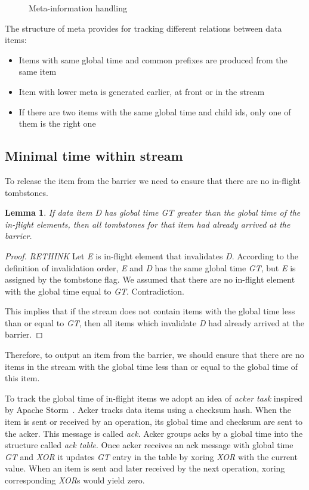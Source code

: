 \begin{figure}[htbp]
  \caption{Meta-information handling}
  \label {logical-graph-ops-figure}
\end{figure}

The structure of meta provides for tracking different relations between data items:

\begin{itemize}
  \item Items with same global time and common prefixes are produced from the same item
  \item Item with lower meta is generated earlier, at front or in the stream
  \item If there are two items with the same global time and child ids, only one of them is the right one
\end{itemize}

\label{mininal-time}
\subsection{Minimal time within stream}

To release the item from the barrier we need to ensure that there are no in-flight tombstones. 

\newtheorem{minimal-time-claim}{Lemma}

\begin{minimal-time-claim}
  If data item {\it D} has global time {\it GT} greater than the global time of the in-flight elements, then all tombstones for that item had already arrived at the barrier.
\end{minimal-time-claim}

\begin{proof}
  {\it RETHINK}
  Let {\it E} is in-flight element that invalidates {\it D}. According to the definition of invalidation order, {\it E} and {\it D} has the same global time {\it GT}, but {\it E} is assigned by the tombstone flag. We assumed that there are no in-flight element with the global time equal to {\it GT}. Contradiction.

  This implies that if the stream does not contain items with the global time less than or equal to {\it GT}, then all items which invalidate {\it D} had already arrived at the barrier. 
\end{proof}

Therefore, to output an item from the barrier, we should ensure that there are no items in the stream with the global time less than or equal to the global time of this item.

To track the global time of in-flight items we adopt an idea of {\it acker task} inspired by Apache Storm~\cite{apache:storm}. Acker tracks data items using a checksum hash. When the item is sent or received by an operation, its global time and checksum are sent to the acker. This message is called {\it ack}. Acker groups acks by a global time into the structure called {\it ack table}. Once acker receives an ack message with global time {\it GT} and {\it XOR} it updates {\it GT} entry in the table by xoring {\it XOR} with the current value. When an item is sent and later received by the next operation, xoring corresponding {\it XOR}s would yield zero.

